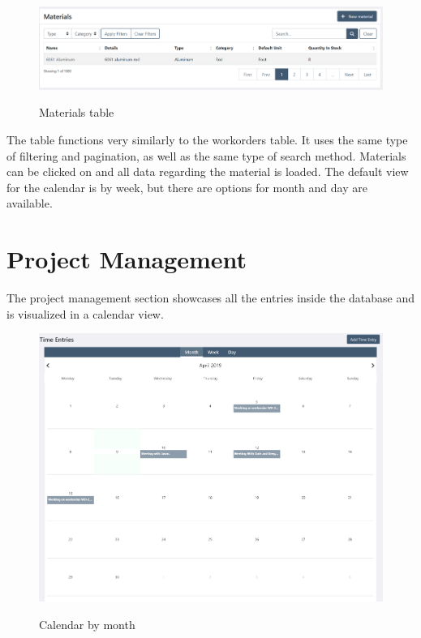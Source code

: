 {{\begin{figure}[H]
	\centering
	\includegraphics[width=5in]{material-table.png}\\
	\caption{Materials table}
	\label{fig:tobias}
\end{figure}

The table functions very similarly to the workorders table. It uses the same type of filtering and pagination, as well as the same type of search method. Materials can be clicked on and all data regarding the material is loaded. The default view for the calendar is by week, but there are options for month and day are available.

\section{Project Management}
The project management section showcases all the entries inside the database and is visualized in a calendar view. 

\begin{figure}[H]
	\centering
	\includegraphics[width=5in]{calendar-month.png}\\
	\caption{Calendar by month}
	\label{fig:tobias}
\end{figure}

}}
